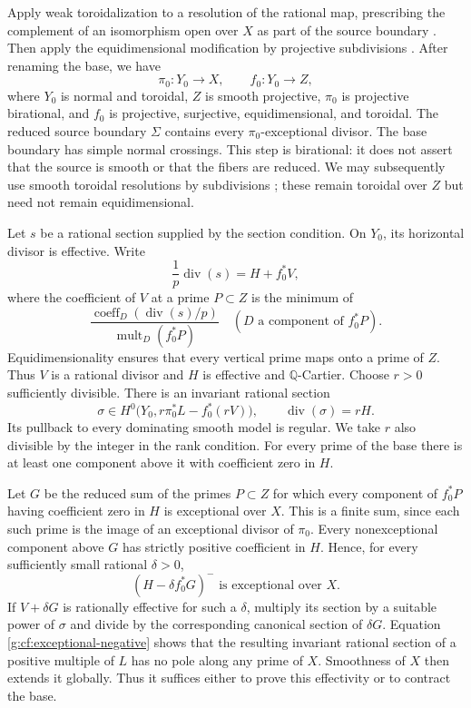 Apply weak toroidalization to a resolution of the rational map,
prescribing the complement of an isomorphism open over $X$ as part of the
source boundary \cite[Theorem~1.1]{ADK2013}.  Then apply the equidimensional
modification by projective subdivisions
\cite[Proposition~4.4, arXiv:alg-geom/9707012v1]{AK2000}.  After renaming the base, we have
\[
 \pi_0:Y_0\longrightarrow X,
 \qquad f_0:Y_0\longrightarrow Z,
\]
where $Y_0$ is normal and toroidal, $Z$ is smooth projective, $\pi_0$ is
projective birational, and $f_0$ is projective, surjective, equidimensional,
and toroidal.  The reduced source boundary $\Sigma$ contains every
$\pi_0$-exceptional divisor.  The base boundary has simple normal
crossings.  This step is birational: it does not assert that the source
is smooth or that the fibers are reduced.  We may subsequently use
smooth toroidal resolutions by subdivisions \cite{KKMSD}; these remain
toroidal over $Z$ but need not remain equidimensional.

Let $s$ be a rational section supplied by the section condition.  On
$Y_0$, its horizontal divisor is effective.  Write
\begin{equation}\label{g:cf:normalization}
 \frac1p\operatorname{div}(s)=H+f_0^*V,
\end{equation}
where the coefficient of $V$ at a prime $P\subset Z$ is the minimum of
\[
 \frac{\operatorname{coeff}_D(\operatorname{div}(s)/p)}
      {\operatorname{mult}_D(f_0^*P)}
 \quad(D\text{ a component of }f_0^*P).
\]
Equidimensionality ensures that every vertical prime maps onto a prime
of $Z$.  Thus $V$ is a rational divisor and $H$ is effective and
$\mathbb Q$-Cartier.  Choose $r>0$ sufficiently divisible.  There is an
invariant rational section
\[
 \sigma\in H^0\bigl(Y_0,r\pi_0^*L-f_0^*(rV)\bigr),
 \qquad \operatorname{div}(\sigma)=rH.
\]
Its pullback to every dominating smooth model is regular. We take $r$
also divisible by the integer in the rank condition.  For every
prime of the base there is at least one component above it with
coefficient zero in $H$.

Let $G$ be the reduced sum of the primes $P\subset Z$ for which every
component of $f_0^*P$ having coefficient zero in $H$ is exceptional over
$X$.  This is a finite sum, since each such prime is the image of an
exceptional divisor of $\pi_0$.  Every nonexceptional component above
$G$ has strictly positive coefficient in $H$.  Hence, for every
sufficiently small rational $\delta>0$,
\begin{equation}\label{g:cf:exceptional-negative}
 (H-\delta f_0^*G)^-
 \text{ is exceptional over }X.
\end{equation}
If $V+\delta G$ is rationally effective for such a $\delta$, multiply its
section by a suitable power of $\sigma$ and divide by the corresponding
canonical section of $\delta G$.  Equation
\eqref{g:cf:exceptional-negative} shows that the resulting invariant
rational section of a positive multiple of $L$ has no pole along any
prime of $X$.  Smoothness of $X$ then extends it globally.  Thus it
suffices either to prove this effectivity or to contract the base.

